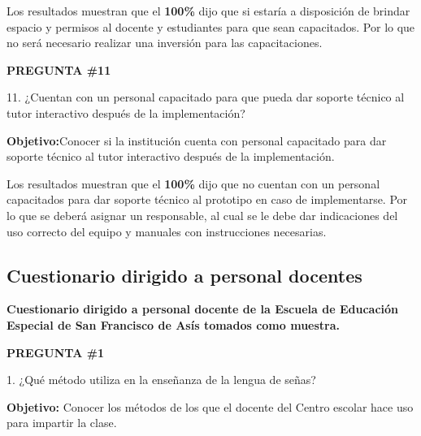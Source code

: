 \documentclass[12pt]{report}%
\begin{document}
\begin{center}
\end{center}


Los resultados muestran que el \textbf{ 100\%} dijo que si estaría a disposición de brindar espacio y permisos al docente y estudiantes para que sean capacitados. Por lo que no será necesario realizar una inversión para las capacitaciones.

\newpage
\textbf{PREGUNTA \#11}

11. ¿Cuentan con un personal capacitado para que pueda dar soporte técnico al tutor interactivo después de la implementación?

\textbf{Objetivo:}Conocer si la institución cuenta con personal capacitado para dar soporte técnico al tutor interactivo después de la implementación.

\begin{center}
\end{center}

Los resultados muestran que el \textbf{ 100\%} dijo que no cuentan con un personal capacitados para dar soporte técnico al prototipo en caso de implementarse. Por lo que se deberá asignar un responsable, al cual se le debe dar  indicaciones del uso correcto del equipo y manuales con instrucciones necesarias.




\newpage

\subsection{Cuestionario dirigido a personal docentes}
\textbf {Cuestionario dirigido a personal docente de la Escuela de Educación Especial de San Francisco de Asís tomados como muestra.}

\textbf{PREGUNTA \#1}

1. ¿Qué método utiliza en la enseñanza de la lengua de señas?

\textbf{Objetivo:} Conocer los métodos de los que el docente del Centro escolar hace uso para impartir la clase. 
\end{document}
